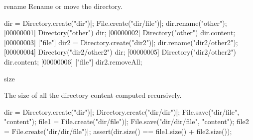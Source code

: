 \begin{urbiscriptapi}
\item[rename]
  Rename or move the directory.
\begin{urbiscript}
dir = Directory.create("dir")|;
File.create("dir/file")|;
dir.rename("other");
[00000001] Directory("other")
dir;
[00000002] Directory("other")
dir.content;
[00000003] ["file"]
dir2 = Directory.create("dir2")|;
dir.rename("dir2/other2");
[00000004] Directory("dir2/other2")
dir;
[00000005] Directory("dir2/other2")
dir.content;
[00000006] ["file"]
dir2.removeAll;
\end{urbiscript}


\item[size]
  \experimental{}

  The size of all the directory content computed recursively.
\begin{urbiscript}
dir = Directory.create("dir")|;
Directory.create("dir/dir")|;
File.save("dir/file", "content");
file1 = File.create("dir/file")|;
File.save("dir/dir/file", "content");
file2 = File.create("dir/dir/file")|;
assert(dir.size() == file1.size() + file2.size());
\end{urbiscript}
\end{urbiscriptapi}

